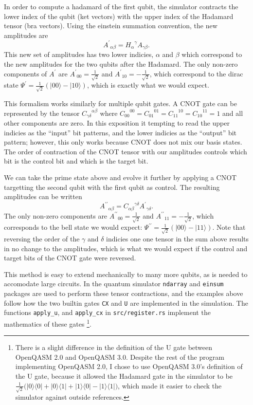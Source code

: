 \documentclass[%
 reprint,
 amsmath,amssymb,
 aps,
]{revtex4-2}
\begin{document}
In order to compute a hadamard of the first qubit, the simulator contracts the lower index of the qubit (ket vectors) with the upper index of the Hadamard tensor (bra vectors). Using the einstein summation convention, the new amplitudes are $${A^\prime}_{\alpha\beta} = {H_{\alpha}}^{\gamma} A_{\gamma\beta} .$$ This new set of amplitudes has two lower indicies, $\alpha$ and $\beta$ which correspond to the new amplitudes for the two qubits after the Hadamard. The only non-zero components of $A^{\prime}$ are ${A^{\prime}}_{00} = \frac{1}{\sqrt{2}}$ and ${A^{\prime}}_{10} = -\frac{1}{\sqrt{2}}$, which correspond to the dirac state $\Psi^{\prime} = \frac{1}{\sqrt{2}} (|00\rangle - |10\rangle)$, which is exactly what we would expect.

This formalism works similarly for multiple qubit gates. A CNOT gate can be represented by the tensor ${C_{\gamma\delta}}^{\alpha\beta}$ where ${C_{00}}^{00} = {C_{01}}^{01} = {C_{11}}^{10} = {C_{10}}^{11} = 1$ and all other components are zero. In this exposition it tempting to read the upper indicies as the ``input'' bit patterns, and the lower indicies as the ``output'' bit pattern; however, this only works because CNOT does not mix our basis states. The order of contraction of the CNOT tensor with our amplitudes controls which bit is the control bit and which is the target bit. 

We can take the prime state above and evolve it further by applying a CNOT targetting the second qubit with the first qubit as control. The resulting amplitudes can be written $${A^{\prime\prime}}_{\alpha\beta} = {C_{\alpha\beta}}^{\gamma\delta} {A^\prime}_{\gamma\delta} .$$ The only non-zero components are ${A^{\prime\prime}}_{00} = \frac{1}{\sqrt{2}}$ and ${A^{\prime\prime}}_{11} = -\frac{1}{\sqrt{2}}$, which corresponds to the bell state we would expect: $\Psi^{\prime\prime} = \frac{1}{\sqrt{2}} (|00\rangle - |11\rangle)$. Note that reversing the order of the $\gamma$ and $\delta$ indicies one one tensor in the sum above results in no change to the amplitudes, which is what we would expect if the control and target bits of the CNOT gate were reversed.

This method is easy to extend mechanically to many more qubits, as is needed to accomodate large circuits. In the quantum simulator \texttt{ndarray} and \texttt{einsum} packages are used to perform these tensor contractions, and the examples above follow how the two builtin gates \texttt{CX} and \texttt{U} are implemented in the simulation. The functions \texttt{apply\_u}, and \texttt{apply\_cx} in \texttt{src/register.rs} implement the mathematics of these gates \footnote{There is a slight difference in the definition of the U gate between OpenQASM 2.0 and OpenQASM 3.0.  Despite the rest of the program implementing OpenQASM 2.0, I chose to use OpenQASM 3.0's definition of the U gate, because it allowed the Hadamard gate in the simulator to be $\frac{1}{\sqrt{2}} \big( |0\rangle\langle0| + |0\rangle\langle1| + |1\rangle\langle0| - |1\rangle\langle1|\big)$, which made it easier to check the simulator against outside references.}. 
\end{document}
